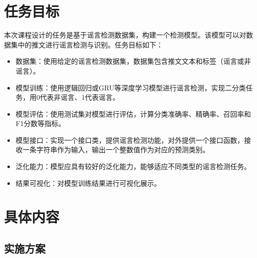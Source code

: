 \chapter{任务目标}

本次课程设计的任务是基于谣言检测数据集，构建一个检测模型。该模型可以对数据集中的推文进行谣言检测与识别。任务目标如下：
\begin{itemize}
    \item 数据集：使用给定的谣言检测数据集，数据集包含推文文本和标签（谣言或非谣言）。
    \item 模型训练：使用逻辑回归或GRU等深度学习模型进行谣言检测，实现二分类任务，用0代表非谣言、1代表谣言。
    \item 模型评估：使用测试集对模型进行评估，计算分类准确率、精确率、召回率和F1分数等指标。
    \item 模型接口：实现一个接口类，提供谣言检测功能，对外提供一个接口函数，接收一条字符串作为输入，输出一个整数值作为对应的预测类别。
    \item 泛化能力：模型应具有较好的泛化能力，能够适应不同类型的谣言检测任务。
    \item 结果可视化：对模型训练结果进行可视化展示。
\end{itemize}



\chapter{具体内容}

\section{实施方案}


